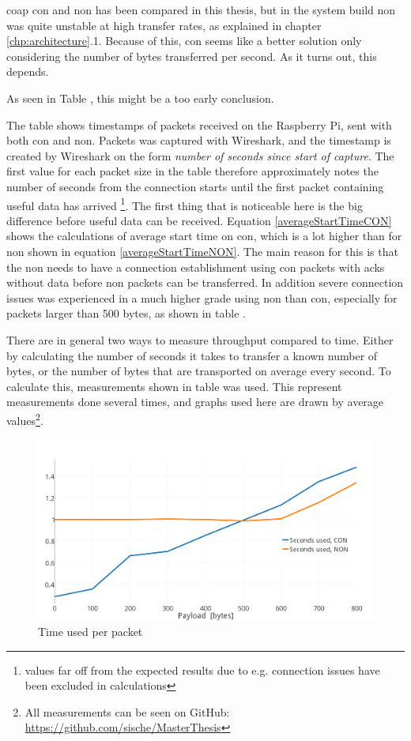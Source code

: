\noindent \gls{coap} \gls{con} and \gls{non} has been compared in this thesis, but in the system build \gls{non} was quite unstable at high transfer rates, as explained in chapter \ref{chp:architecture}.1. Because of this, \gls{con} seems like a better solution only considering the number of bytes transferred per second. As it turns out, this depends. 

As seen in Table , this might be a too early conclusion.

\noindent The table shows timestamps of packets received on the Raspberry Pi, sent with both \gls{con} and \gls{non}. Packets was captured with Wireshark, and the timestamp is created by Wireshark on the form \textit{number of seconds since start of capture}. The first value for each packet size in the table therefore approximately notes the number of seconds from the connection starts until the first packet containing useful data has arrived \footnote{values far off from the expected results due to e.g. connection issues have been excluded in calculations }. The first thing that is noticeable here is the big difference before useful data can be received. Equation \ref{averageStartTimeCON} shows the calculations of average start time on \gls{con}, which is a lot higher than for \gls{non} shown in equation \ref{averageStartTimeNON}. The main reason for this is that the \gls{non} needs to have a connection establishment using \gls{con} packets with \glspl{ack} without data before \gls{non} packets can be transferred. In addition severe connection issues was experienced in a much higher grade using \gls{non} than \gls{con}, especially for packets larger than 500 bytes, as shown in table .  


\noindent There are in general two ways to measure throughput compared to time. Either by calculating the number of seconds it takes to transfer a known number of bytes, or the number of bytes that are transported on average every second. To calculate this, measurements shown in table  was used. This represent measurements done several times, and graphs used here are drawn by average values\footnote{All measurements can be seen on GitHub: \url{https://github.com/sische/MasterThesis}}. 

\begin{figure}[ht]
    \centering
    \includegraphics[scale=1.0]{timeUsedPRpacket2.png}    
    \caption{Time used per packet}
    \label{fig:timeUsedPRpacket}
\end{figure}

